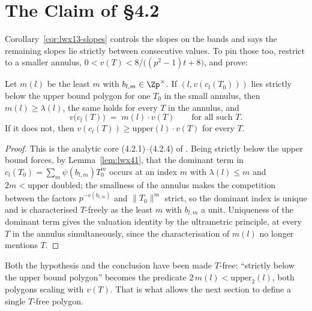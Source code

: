 \section{The Claim of \S4.2}

Corollary~\ref{cor:lwx13-slopes} controls the slopes on the bands and says the remaining slopes
lie strictly between consecutive values.  To pin those too, \cite[\S4.2]{LWX} restrict to a
smaller annulus, $0 < v(T) < 8/\bigl((p^{2}-1)t+8\bigr)$, and prove:

\begin{theorem}
  \label{thm:lwx-claim}
  \leanok
  Let $m(l)$ be the least $m$ with $b_{l,m}\in\Zp^{\times}$.  If $(l, v(c_l(T_0)))$ lies strictly
  below the upper bound polygon for one $T_0$ in the small annulus, then $m(l)\geq\lambda(l)$,
  the same holds for every $T$ in the annulus, and
  \[
    v\bigl(c_l(T)\bigr) \;=\; m(l)\cdot v(T) \qquad\text{for all such } T .
  \]
  If it does not, then $v(c_l(T))\geq \mathrm{upper}(l)\cdot v(T)$ for every $T$.
\end{theorem}

\begin{proof}
  \leanok
  This is the analytic core (4.2.1)--(4.2.4) of \cite{LWX}.  Being strictly below the upper bound
  forces, by Lemma~\ref{lem:lwx41}, that the dominant term in
  $c_l(T_0) = \sum_m \psi(b_{l,m})T_0^{m}$ occurs at an index $m$ with
  $\lambda(l)\leq m$ and $2m < \mathrm{upper}$ doubled; the smallness of the annulus makes the
  competition between the factors $p^{-v(b_{l,m})}$ and $\lVert T_0\rVert^{m}$ strict, so the
  dominant index is unique and is characterised $T$-freely as the least $m$ with $b_{l,m}$ a
  unit.  Uniqueness of the dominant term gives the valuation identity by the ultrametric
  principle, at every $T$ in the annulus simultaneously, since the characterisation of $m(l)$ no
  longer mentions $T$.
\end{proof}

Both the hypothesis and the conclusion have been made $T$-free: ``strictly below the upper bound
polygon'' becomes the predicate $2\,m(l) < \mathrm{upper}_{2}(l)$, both polygons scaling with
$v(T)$.  That is what allows the next section to define a single $T$-free polygon.

